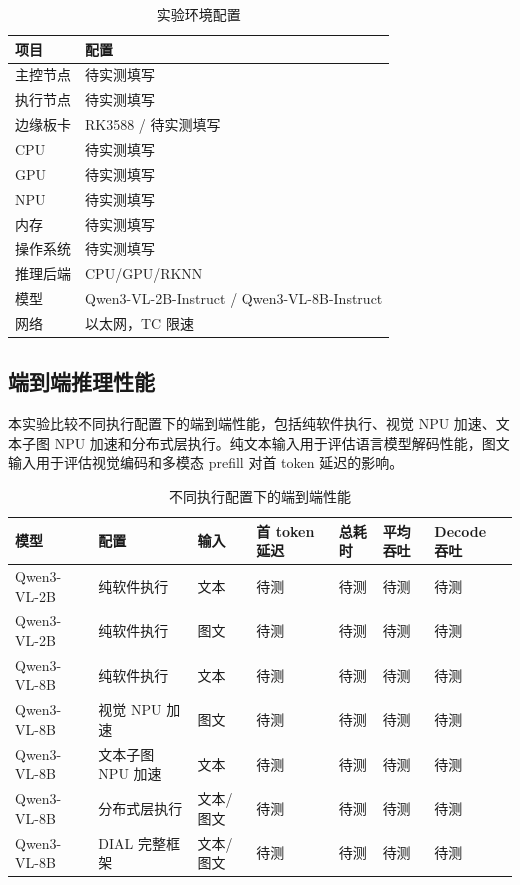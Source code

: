 \documentclass[10pt,a4paper,twocolumn]{ctexart}
\begin{document}
\begin{table}[t]
\centering
\caption{实验环境配置}
\small
\begin{tabular}{ll}
\toprule
项目 & 配置 \\
\midrule
主控节点 & 待实测填写 \\
执行节点 & 待实测填写 \\
边缘板卡 & RK3588 / 待实测填写 \\
CPU & 待实测填写 \\
GPU & 待实测填写 \\
NPU & 待实测填写 \\
内存 & 待实测填写 \\
操作系统 & 待实测填写 \\
推理后端 & CPU/GPU/RKNN \\
模型 & Qwen3-VL-2B-Instruct / Qwen3-VL-8B-Instruct \\
网络 & 以太网，TC 限速 \\
\bottomrule
\end{tabular}
\end{table}

\subsection{端到端推理性能}

本实验比较不同执行配置下的端到端性能，包括纯软件执行、视觉 NPU 加速、文本子图 NPU 加速和分布式层执行。纯文本输入用于评估语言模型解码性能，图文输入用于评估视觉编码和多模态 prefill 对首 token 延迟的影响。

\begin{table}[t]
\centering
\caption{不同执行配置下的端到端性能}
\scriptsize
\begin{tabularx}{\textwidth}{@{}>{\raggedright\arraybackslash}X >{\raggedright\arraybackslash}X >{\raggedright\arraybackslash}X >{\raggedright\arraybackslash}X >{\raggedright\arraybackslash}X >{\raggedright\arraybackslash}X >{\raggedright\arraybackslash}X@{}}
\toprule
模型 & 配置 & 输入 & 首 token 延迟 & 总耗时 & 平均吞吐 & Decode 吞吐 \\
\midrule
Qwen3-VL-2B & 纯软件执行 & 文本 & 待测 & 待测 & 待测 & 待测 \\
Qwen3-VL-2B & 纯软件执行 & 图文 & 待测 & 待测 & 待测 & 待测 \\
Qwen3-VL-8B & 纯软件执行 & 文本 & 待测 & 待测 & 待测 & 待测 \\
Qwen3-VL-8B & 视觉 NPU 加速 & 图文 & 待测 & 待测 & 待测 & 待测 \\
Qwen3-VL-8B & 文本子图 NPU 加速 & 文本 & 待测 & 待测 & 待测 & 待测 \\
Qwen3-VL-8B & 分布式层执行 & 文本/图文 & 待测 & 待测 & 待测 & 待测 \\
Qwen3-VL-8B & DIAL 完整框架 & 文本/图文 & 待测 & 待测 & 待测 & 待测 \\
\bottomrule
\end{tabularx}
\end{table}
\end{document}
